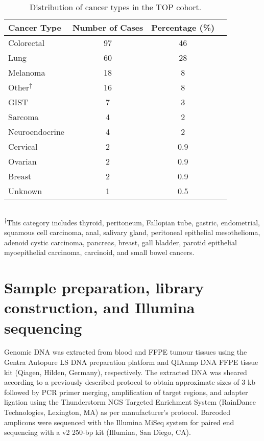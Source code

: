 \begin{table}[H]
\caption{Distribution of cancer types in the TOP cohort.}
\label{tbl:cancertypes}
\centering
      \begin{tabular}{lccc}
        \hline
        Cancer Type & Number of Cases & Percentage (\%) \\ \hline
        Colorectal & 97 & 46 \\
        Lung & 60 & 28 \\
        Melanoma & 18 & 8 \\
				Other\textsuperscript{$\dagger$} & 16 & 8 \\
				GIST & 7 & 3 \\
				Sarcoma & 4 & 2 \\
				Neuroendocrine & 4 & 2 \\
				Cervical & 2 & 0.9 \\
				Ovarian & 2 & 0.9 \\
				Breast & 2 & 0.9 \\
				Unknown & 1 & 0.5 \\ \hline
      \end{tabular} \\
			\vspace{0.5cm}
\justify
{\small \textsuperscript{$\dagger$}This category includes thyroid, peritoneum, Fallopian tube, gastric, endometrial, squamous cell carcinoma, anal, salivary gland, peritoneal epithelial mesothelioma, adenoid cystic carcinoma, pancreas, breast, gall bladder, parotid epithelial myoepithelial carcinoma, carcinoid, and small bowel cancers.}
\end{table}

\section{Sample preparation, library construction, and Illumina sequencing}
\label{sec:Samplepreparation,libraryconstruction,andIlluminasequencing}

Genomic DNA was extracted from blood and FFPE tumour tissues using the Gentra Autopure LS DNA preparation platform and QIAamp DNA FFPE tissue kit (Qiagen, Hilden, Germany), respectively. The extracted DNA was sheared according to a previously described protocol \cite{Bosdet2013} to obtain approximate sizes of 3 kb followed by PCR primer merging, amplification of target regions, and adapter ligation using the Thunderstorm NGS Targeted Enrichment System (RainDance Technologies, Lexington, MA) as per manufacturer's protocol. Barcoded amplicons were sequenced with the Illumina MiSeq system for paired end sequencing with a v2 250-bp kit (Illumina, San Diego, CA).

